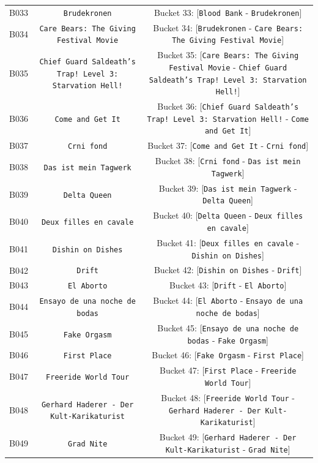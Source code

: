 \documentclass[11pt,a4paper]{article}
\begin{document}
{\begin{xltabular}{\textwidth}{l | C | C}
B033 & \texttt{Brudekronen} & Bucket 33: [\texttt{Blood Bank} - \texttt{Brudekronen}] \\
B034 & \texttt{Care Bears: The Giving Festival Movie} & Bucket 34: [\texttt{Brudekronen} - \texttt{Care Bears: The Giving Festival Movie}] \\
B035 & \texttt{Chief Guard Saldeath's Trap! Level 3: Starvation Hell!} & Bucket 35: [\texttt{Care Bears: The Giving Festival Movie} - \texttt{Chief Guard Saldeath's Trap! Level 3: Starvation Hell!}] \\
B036 & \texttt{Come and Get It} & Bucket 36: [\texttt{Chief Guard Saldeath's Trap! Level 3: Starvation Hell!} - \texttt{Come and Get It}] \\
B037 & \texttt{Crni fond} & Bucket 37: [\texttt{Come and Get It} - \texttt{Crni fond}] \\
B038 & \texttt{Das ist mein Tagwerk} & Bucket 38: [\texttt{Crni fond} - \texttt{Das ist mein Tagwerk}] \\
B039 & \texttt{Delta Queen} & Bucket 39: [\texttt{Das ist mein Tagwerk} - \texttt{Delta Queen}] \\
B040 & \texttt{Deux filles en cavale} & Bucket 40: [\texttt{Delta Queen} - \texttt{Deux filles en cavale}] \\
B041 & \texttt{Dishin on Dishes} & Bucket 41: [\texttt{Deux filles en cavale} - \texttt{Dishin on Dishes}] \\
B042 & \texttt{Drift} & Bucket 42: [\texttt{Dishin on Dishes} - \texttt{Drift}] \\
B043 & \texttt{El Aborto} & Bucket 43: [\texttt{Drift} - \texttt{El Aborto}] \\
B044 & \texttt{Ensayo de una noche de bodas} & Bucket 44: [\texttt{El Aborto} - \texttt{Ensayo de una noche de bodas}] \\
B045 & \texttt{Fake Orgasm} & Bucket 45: [\texttt{Ensayo de una noche de bodas} - \texttt{Fake Orgasm}] \\
B046 & \texttt{First Place} & Bucket 46: [\texttt{Fake Orgasm} - \texttt{First Place}] \\
B047 & \texttt{Freeride World Tour} & Bucket 47: [\texttt{First Place} - \texttt{Freeride World Tour}] \\
B048 & \texttt{Gerhard Haderer - Der Kult-Karikaturist} & Bucket 48: [\texttt{Freeride World Tour} - \texttt{Gerhard Haderer - Der Kult-Karikaturist}] \\
B049 & \texttt{Grad Nite} & Bucket 49: [\texttt{Gerhard Haderer - Der Kult-Karikaturist} - \texttt{Grad Nite}] \\

\end{xltabular}}
\end{document}
